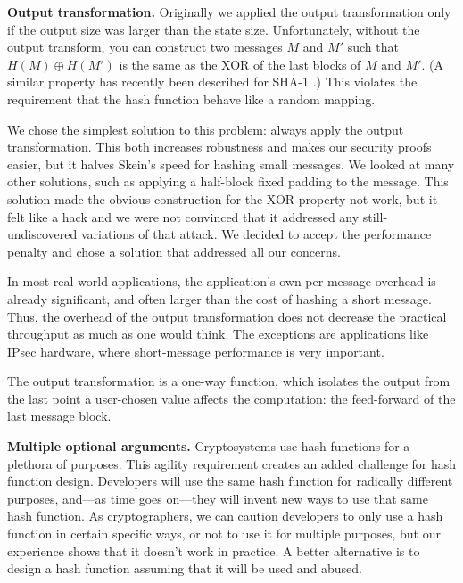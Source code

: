 \documentclass[11pt,twoside]{article}
\newcommand{\xor}{\oplus}
\begin{document}
{\bf Output transformation.} Originally we applied the output transformation only if the output size was larger than the state size. Unfortunately, without the output transform, you can construct two messages $M$ and $M'$ such that $H(M) \xor H(M')$ is the same as the XOR of the last blocks of $M$ and $M'$. (A similar property has recently been described for SHA-1 \cite{SS08}.)  This violates the requirement that the hash function behave like a random mapping.

We chose the simplest solution to this problem: always apply the
output transformation.  This both increases robustness and makes our
security proofs easier, but it halves Skein's speed for hashing small
messages. We looked at many other solutions,  such as applying a half-block fixed padding to the message. This solution made the obvious construction for the XOR-property not work, but it felt like a hack and we were not convinced that it addressed any still-undiscovered variations of that attack.  We decided to accept the performance penalty and chose a solution that addressed all our concerns.

In most real-world applications, the application's own per-message overhead is already significant, and often larger than the cost of hashing a short message. Thus, the overhead of the output transformation does not decrease the practical throughput as much as one would think. The exceptions are applications like IPsec hardware, where short-message performance is very important.

The output transformation is a one-way function, which isolates the output from the last point a user-chosen value affects the computation: the feed-forward of the last message block.

{\bf Multiple optional arguments.}  Cryptosystems use hash functions for a plethora of purposes.  This agility requirement creates an added challenge for hash function design.  Developers will use the same hash function for radically different purposes, and---as time goes on---they will invent new ways to use that same hash function.  As cryptographers, we can caution developers to only use a hash function in certain specific ways, or not to use it for multiple purposes, but our experience shows that it doesn't work in practice.  A better alternative is to design a hash function assuming that it will be used and abused.
\end{document}
